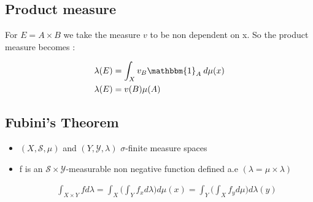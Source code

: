 \subsection{Product measure}
For $E = A \times B$ we take the measure $v$ to be non dependent on x. So the product measure becomes :

\begin{align}
\lambda(E) &= \int_X v_B\mathbbm{1}_A\:d\mu(x) \\
\lambda(E) &= v(B)\mu(A)
\end{align}

\subsection{Fubini's Theorem}
\begin{itemize}
\item $(X, \mathcal{S}, \mu)$ and $(Y, \mathcal{Y}, \lambda)$ $\sigma$-finite measure spaces

\item f is an $\mathcal{S} \times \mathcal{Y}$-measurable non negative function defined a.e $(\lambda = \mu \times \lambda)$

\begin{align}
\int_{X \times Y}fd\lambda = \int_X \Big(\int_Yf_xd\lambda\Big)d\mu(x) = \int_Y \Big(\int_Xf_yd\mu\Big)d\lambda(y)
\end{align}

\end{itemize}

